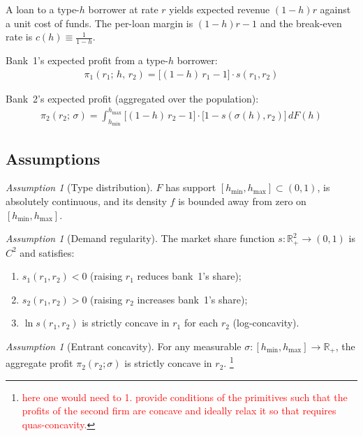\documentclass[12pt]{article}
\theoremstyle{plain}
\theoremstyle{plain}
\theoremstyle{definition}  %
\theoremstyle{remark}  %
\newtheorem{ass}[thm]{Assumption}
\begin{document}
A loan to a type-$h$ borrower at rate $r$ yields expected revenue $(1-h)r$ against a unit cost of funds. The per-loan margin is $(1-h)r - 1$ and the break-even rate is $c(h) \equiv \frac{1}{1-h}$.

\medskip\noindent
Bank~1's expected profit from a type-$h$ borrower:
\begin{align}\label{eq:pi1}
    \pi_1(r_1;\, h,\, r_2) = \big[(1-h)\,r_1 - 1\big] \cdot s(r_1, r_2)
\end{align}

\medskip\noindent
Bank~2's expected profit (aggregated over the population):
\begin{align}\label{eq:pi2}
    \pi_2(r_2;\, \sigma) = \int_{h_{\min}}^{h_{\max}} \big[(1-h)\,r_2 - 1\big] \cdot \big[1 - s(\sigma(h), r_2)\big] \, dF(h)
\end{align}

\subsection{Assumptions}

\begin{ass}[Type distribution]\label{ass:F}
$F$ has support $[h_{\min}, h_{\max}] \subset (0,1)$, is absolutely continuous, and its density $f$ is bounded away from zero on $[h_{\min}, h_{\max}]$.
\end{ass}

\begin{ass}[Demand regularity]\label{ass:demand}
The market share function $s: \mathbb{R}_+^2 \to (0,1)$ is $C^2$ and satisfies:
\begin{enumerate}
    \item[(i)] $s_1(r_1, r_2) < 0$ \quad (raising $r_1$ reduces bank~1's share);
    \item[(ii)] $s_2(r_1, r_2) > 0$ \quad (raising $r_2$ increases bank~1's share);
    \item[(iii)] $\ln s(r_1, r_2)$ is strictly concave in $r_1$ for each $r_2$ \quad (log-concavity).
\end{enumerate}
\end{ass}

\begin{ass}[Entrant concavity]\label{ass:pi2conc}
For any measurable $\sigma: [h_{\min}, h_{\max}] \to \mathbb{R}_+$, the aggregate profit $\pi_2(r_2; \sigma)$ is strictly concave in $r_2$. \footnote{\textcolor{red}{here one would need to 1. provide conditions of the primitives such that the profits of the second firm are concave and ideally relax it so that requires quas-concavity.}}
\end{ass}
\end{document}

